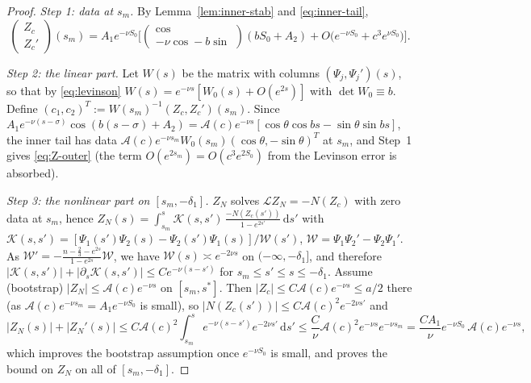 \documentclass[11pt,a4paper]{amsart}
\theoremstyle{definition}
\theoremstyle{remark}
\newcommand{\dd}{\,\mathrm{d}}
\begin{document}
\begin{proof}
\emph{Step 1: data at $s_m$.}  By Lemma~\ref{lem:inner-stab} and \eqref{eq:inner-tail},
\[
\begin{pmatrix}Z_c\\ Z_c'\end{pmatrix}(s_m)=A_1e^{-\nu S_0}\Big[\begin{pmatrix}\cos\\ -\nu\cos-b\sin\end{pmatrix}(bS_0+A_2)+O\big(e^{-\nu S_0}+c^3e^{\nu S_0}\big)\Big].
\]

\emph{Step 2: the linear part.}  Let $W(s)$ be the matrix with columns $(\Psi_j,\Psi_j')(s)$, so that by \eqref{eq:levinson} $W(s)=e^{-\nu s}[W_0(s)+O(e^{2s})]$ with $\det W_0\equiv b$.  Define $(c_1,c_2)^T:=W(s_m)^{-1}(Z_c,Z_c')(s_m)$.  Since $A_1e^{-\nu(s-\sigma)}\cos(b(s-\sigma)+A_2)=\mathcal A(c)e^{-\nu s}[\cos\theta\cos bs-\sin\theta\sin bs]$, the inner tail has data $\mathcal A(c)e^{-\nu s_m}W_0(s_m)(\cos\theta,-\sin\theta)^T$ at $s_m$, and Step~1 gives \eqref{eq:Z-outer} (the term $O(e^{2s_m})=O(c^3e^{2S_0})$ from the Levinson error is absorbed).

\emph{Step 3: the nonlinear part on $[s_m,-\delta_1]$.}  $Z_N$ solves $\mathcal LZ_N=-N(Z_c)$ with zero data at $s_m$, hence
$Z_N(s)=\int_{s_m}^s\mathcal K(s,s')\,\frac{-N(Z_c(s'))}{1-e^{2s'}}\dd s'$ with $\mathcal K(s,s')=[\Psi_1(s')\Psi_2(s)-\Psi_2(s')\Psi_1(s)]/\mathcal W(s')$, $\mathcal W=\Psi_1\Psi_2'-\Psi_2\Psi_1'$.  As $\mathcal W'=-\frac{n-\frac23-e^{2s}}{1-e^{2s}}\mathcal W$, we have $\mathcal W(s)\asymp e^{-2\nu s}$ on $(-\infty,-\delta_1]$, and therefore $|\mathcal K(s,s')|+|\partial_s\mathcal K(s,s')|\le Ce^{-\nu(s-s')}$ for $s_m\le s'\le s\le-\delta_1$.  Assume (bootstrap) $|Z_N|\le\mathcal A(c)e^{-\nu s}$ on $[s_m,s^*]$.  Then $|Z_c|\le C\mathcal A(c)e^{-\nu s}\le a/2$ there (as $\mathcal A(c)e^{-\nu s_m}=A_1e^{-\nu S_0}$ is small), so $|N(Z_c(s'))|\le C\mathcal A(c)^2e^{-2\nu s'}$ and
\[
|Z_N(s)|+|Z_N'(s)|\le C\mathcal A(c)^2\int_{s_m}^se^{-\nu(s-s')}e^{-2\nu s'}\dd s'\le \frac{C}{\nu}\mathcal A(c)^2e^{-\nu s}e^{-\nu s_m}=\frac{CA_1}{\nu}e^{-\nu S_0}\,\mathcal A(c)e^{-\nu s},
\]
which improves the bootstrap assumption once $e^{-\nu S_0}$ is small, and proves the bound on $Z_N$ on all of $[s_m,-\delta_1]$.


\end{proof}
\end{document}
